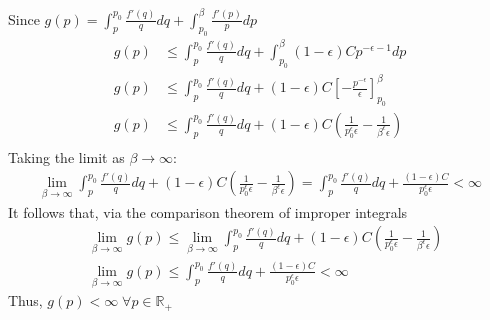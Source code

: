 \documentclass[12pt]{article}
\begin{document}
Since $g(p) = \int_{p}^{p_0}\frac{f'(q)}{q} dq + \int_{p_0}^{\beta}\frac{f'(p)}{p} dp $
\begin{align*}
    g(p) & \leq \int_{p}^{p_0}\frac{f'(q)}{q} dq +\int_{p_0}^{\beta}(1-\epsilon)Cp^{-\epsilon-1}dp                                                 \\
    g(p) & \leq \int_{p}^{p_0}\frac{f'(q)}{q} dq +(1-\epsilon)C\left[-\frac{p^{-\epsilon}}{\epsilon} \right]^\beta_{p_0}                           \\
    g(p) & \leq \int_{p}^{p_0}\frac{f'(q)}{q} dq +(1-\epsilon)C\left( \frac{1}{p_0^{\epsilon}\epsilon} - \frac{1}{\beta^{\epsilon}\epsilon}\right) \\
\end{align*}
Taking the limit as $\beta\rightarrow\infty$:
\begin{align*}
    \lim_{\beta\rightarrow\infty} \int_{p}^{p_0}\frac{f'(q)}{q} dq +(1-\epsilon)C\left( \frac{1}{p_0^{\epsilon}\epsilon} - \frac{1}{\beta^{\epsilon}\epsilon}\right) = \int_{p}^{p_0}\frac{f'(q)}{q} dq +\frac{(1-\epsilon)C}{p_0^{\epsilon}\epsilon} <\infty
\end{align*}
It follows that, via the comparison theorem of improper integrals
\begin{align*}
     & \lim_{\beta\rightarrow\infty} g(p) \leq \lim_{\beta\rightarrow\infty} \int_{p}^{p_0}\frac{f'(q)}{q} dq +(1-\epsilon)C\left( \frac{1}{p_0^{\epsilon}\epsilon} - \frac{1}{\beta^{\epsilon}\epsilon}\right) \\
     & \lim_{\beta\rightarrow\infty} g(p) \leq \int_{p}^{p_0}\frac{f'(q)}{q} dq +\frac{(1-\epsilon)C}{p_0^{\epsilon}\epsilon} <\infty
\end{align*}
Thus, $g(p)<\infty \; \forall p\in\mathbb{R_+}$
\end{document}
